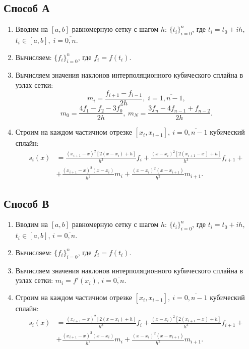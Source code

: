 \documentclass[
11pt,
master, %
subf, %
href, %
colorlinks=true, %
times, %
]{disser}
\begin{document}
\subsection{Способ А}
\begin{enumerate}
  \item Вводим на $[a, b]$ равномерную сетку с шагом $h$: $\{t_i\}_{i = 0}^n$, где $t_i = t_0 + ih$, $t_i \in [a, b],\;i = \overline{0, n}$.
  \item Вычисляем: $\{f_i\}_{i = 0}^n$, где $f_i = f(t_i)$.
  \item Вычисляем значения наклонов интерполяционного кубического сплайна в узлах сетки:
      $$m_i = \frac{f_{i + 1} - f_{i - 1}}{2 h},\;i = \overline{1, n - 1},$$
      $$m_0 = \frac{4 f_{1} - f_2 - 3 f_0}{2 h}, ~m_N = \frac{3 f_n - 4 f_{n - 1} + f_{n - 2}}{2 h}.$$
  \item Строим на каждом частичном отрезке $[x_i,x_{i+1}], ~ i=\overline{0, n-1}$ кубический сплайн:
  \begin{align*}
  	s_i(x) &= \frac{(x_{i + 1} - x)^2 [2 (x - x_i) + h]}{h^3} f_i + \frac{(x - x_{i})^2 [2 (x _{i + 1} - x) + h]}{h^3} f_{i+1} + \\
  	&+ \frac{(x_{i + 1} - x)^2 (x - x_i) }{h^2} m_i + \frac{(x- x_i)^2 (x - x_{i+ 1})}{h^2} m_{i+1}.
  \end{align*}
\end{enumerate}



\subsection{Способ В}
\begin{enumerate}
  \item Вводим на $[a, b]$ равномерную сетку с шагом $h$: $\{t_i\}_{i = 0}^n$, где $t_i = t_0 + ih$, $t_i \in [a, b]$, $i = \overline{0, n}$.
  \item Вычисляем: $\{f_i\}_{i = 0}^n$, где $f_i = f(t_i)$.
  \item Вычисляем значения наклонов интерполяционного кубического сплайна в узлах сетки:
   $m_i = f'(x_i)$, $i = \overline{0, n}$.
  \item Строим на каждом частичном отрезке $[x_i,x_{i+1}], ~ i=\overline{0, n-1}$ кубический сплайн:
\begin{align*}
	s_i(x) &= \frac{(x_{i + 1} - x)^2 [2 (x - x_i) + h]}{h^3} f_i + \frac{(x - x_{i})^2 [2 (x _{i + 1} - x) + h]}{h^3} f_{i+1} + \\
	&+ \frac{(x_{i + 1} - x)^2 (x - x_i) }{h^2} m_i + \frac{(x- x_i)^2 (x - x_{i+ 1})}{h^2} m_{i+1}.
\end{align*}
\end{enumerate}
\end{document}
